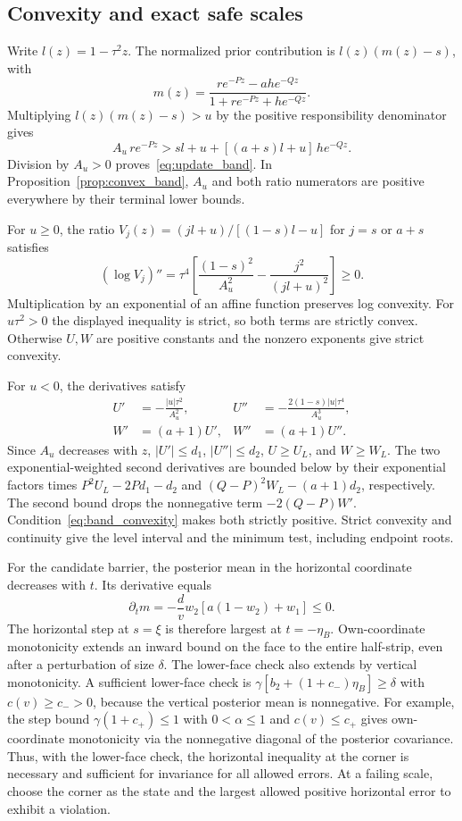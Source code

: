 \subsection{Convexity and exact safe scales}
Write $l(z)=1-\tau^2 z$. The normalized prior contribution is
$l(z)(m(z)-s)$, with
\[
 m(z)=\frac{r e^{-Pz}-a h e^{-Qz}}{1+r e^{-Pz}+h e^{-Qz}}.
\]
Multiplying $l(z)(m(z)-s)>u$ by the positive responsibility
denominator gives
\[
 A_u\,r e^{-Pz}> s l+u+[(a+s)l+u]\,h e^{-Qz}.
\]
Division by $A_u>0$ proves~\eqref{eq:update_band}. In
Proposition~\ref{prop:convex_band}, $A_u$ and both ratio numerators
are positive everywhere by their terminal lower bounds.

For $u\ge0$, the ratio
$V_j(z)=(j l+u)/[(1-s)l-u]$ for $j=s$ or $a+s$ satisfies
\[
 (\log V_j)''=\tau^4
 \left[\frac{(1-s)^2}{A_u^2}-\frac{j^2}{(j l+u)^2}\right]\ge0 .
\]
Multiplication by an exponential of an affine function preserves
log convexity. For $u\tau^2>0$ the displayed inequality is strict,
so both terms are strictly convex. Otherwise $U,W$ are positive
constants and the nonzero exponents give strict convexity.

For $u<0$, the derivatives satisfy
\[
 \begin{aligned}
 U'&=-\frac{|u|\tau^2}{A_u^2},&
 U''&=-\frac{2(1-s)|u|\tau^4}{A_u^3},\\
 W'&=(a+1)U',&
 W''&=(a+1)U'' .
 \end{aligned}
\]
Since $A_u$ decreases with $z$, $|U'|\le d_1$,
$|U''|\le d_2$, $U\ge U_L$, and $W\ge W_L$.
The two exponential-weighted second derivatives are bounded below
by their exponential factors times $P^2U_L-2Pd_1-d_2$ and
$(Q-P)^2W_L-(a+1)d_2$, respectively. The second bound drops
the nonnegative term $-2(Q-P)W'$. Condition~\eqref{eq:band_convexity}
makes both strictly positive. Strict convexity and continuity give
the level interval and the minimum test, including endpoint roots.

For the candidate barrier, the posterior mean in the horizontal
coordinate decreases with $t$. Its derivative equals
\[
 \partial_t m=-\frac{d}{v}w_2[a(1-w_2)+w_1]\le0 .
\]
The horizontal step at $s=\xi$ is therefore largest at $t=-\eta_B$.
Own-coordinate monotonicity extends an inward bound on the face
to the entire half-strip, even after a perturbation of size $\delta$.
The lower-face check also extends by vertical monotonicity.
A sufficient lower-face check is
$\gamma[b_2+(1+c_-)\eta_B]\ge\delta$ with $c(v)\ge c_->0$,
because the vertical posterior mean is nonnegative. For example,
the step bound $\gamma(1+c_+)\le1$ with $0<\alpha\le1$ and $c(v)\le c_+$
gives own-coordinate monotonicity via the nonnegative diagonal
of the posterior covariance. Thus, with the lower-face check,
the horizontal inequality at the corner is necessary and sufficient
for invariance for all allowed errors. At a failing scale, choose
the corner as the state and the largest allowed positive horizontal
error to exhibit a violation.

